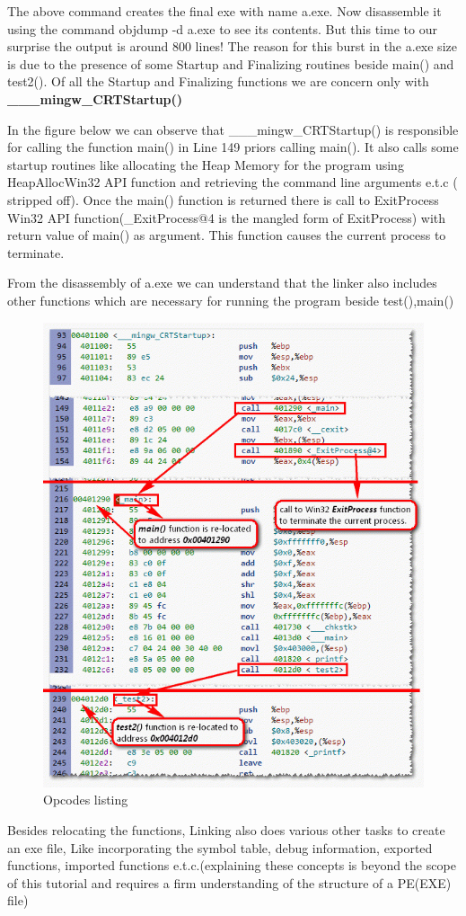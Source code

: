 \documentclass{article}
\begin{document}
The above command creates the final exe with name a.exe. Now disassemble it using the command objdump -d a.exe to see its contents. But this time to our surprise the output is around 800 lines! The reason for this burst in the a.exe size is due to the presence of some Startup and Finalizing routines beside main() and test2(). Of all the Startup and Finalizing functions we are concern only with
\textbf{\_\_\_mingw\_CRTStartup() }

In the figure below we can observe that \_\_\_mingw\_CRTStartup() is responsible for calling the function main() in Line 149 priors calling main(). It also calls some startup routines like allocating the Heap Memory for the program using HeapAllocWin32 API function and retrieving the command line arguments e.t.c ( stripped off). Once the main() function is returned there is call to ExitProcess Win32 API function(\_ExitProcess@4 is the mangled form of ExitProcess) with return value of main() as argument. This function causes the current process to terminate.

From the disassembly of a.exe we can understand that the linker also includes other functions which are necessary for running the program beside test(),main()
\begin{figure}[H]
\centering
\includegraphics[width=\textwidth]{Linking2.png}
\caption{Opcodes listing}
\end{figure}
Besides relocating the functions, Linking also does various other tasks to create an exe file, Like incorporating the symbol table, debug information, exported functions, imported functions e.t.c.(explaining these concepts is beyond the scope of this tutorial and requires a firm understanding of the structure of a PE(EXE) file)
\end{document}
